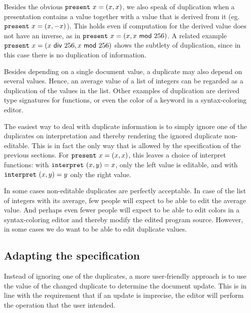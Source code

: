 Besides the obvious ${\tt present}~x = (x, x)$, we also speak of duplication when a presentation contains a value together with a value that is derived from it (eg. ${\tt present}~x = (x, -x)$). This holds even if computation for the derived value does not have an inverse, as in ${\tt present}~x = (x, x~{\mathsf {mod}}~256)$.  A related example ${\tt present}~x = (x~{\mathsf {div}}~256, x~{\mathsf {mod}}~256)$ shows the subtlety of duplication, since in this case there is no duplication of information. 

Besides depending on a single document value, a duplicate may also depend on several values. Hence, an average value of a list of integers can be regarded as a duplication of the values in the list. Other examples of duplication are derived type signatures for functions, or even the color of a keyword in a syntax-coloring editor.



The easiest way to deal with duplicate information is to simply ignore one of the duplicates on interpretation and thereby rendering the ignored duplicate non-editable. This is in fact the only way that is allowed by the specification of the previous sections. For ${\tt present}~x = (x,x)$, this leaves a choice of interpret functions: with ${\tt interpret}~(x,y) = x$, only the left value is editable, and with ${\tt interpret}~(x,y) = y$ only the right value.

In some cases non-editable duplicates are perfectly acceptable. In case of the list of integers with its average, few people will expect to be able to edit the average value. And perhaps even fewer people will expect to be able to edit colors in a syntax-coloring editor and thereby modify the edited program source. However, in some cases we do want to be able to edit duplicate values.

\subsection{Adapting the specification}
Instead of ignoring one of the duplicates, a more user-friendly approach is to use the value of the changed duplicate to determine the document update. This is in line with the requirement that if an update is imprecise, the editor will perform the operation that the user intended. 

